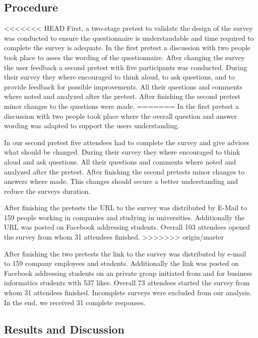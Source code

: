 \documentclass{llncs}
\begin{document}
\begin{keywords}
\subsection{Procedure} %
\label{sec:Procedure}

<<<<<<< HEAD
First, a two-stage pretest to validate the design of the survey was conducted to ensure the questionnaire is understandable and time required to complete the survey is adequate. In the first pretest a discussion with two people took place to asses the wording of the questionnaire. After changing the survey the user feedback a second pretest with five participants was conducted. During their survey they where encouraged to think aloud, to ask questions, and to provide feedback for possible improvements. All their questions and comments where noted and analyzed after the pretest. After finishing the second pretest minor changes to the questions were made. 
=======
In the first pretest a discussion with two people took place where the overall question and answer wording was adapted to support the users understanding.

In our second pretest five attendees had to complete the survey and give advices what should be changed. During their survey they where encouraged to think aloud and ask questions. All their questions and comments where noted and analyzed after the pretest. After finishing the second pretests minor changes to answers where made. This changes should secure a better understanding and reduce the surveys duration.

After finishing the pretests the URL to the survey was distributed by E-Mail to 159 people working in companies and studying in universities. Additionally the URL was posted on Facebook addressing students. Overall 103 attendees opened the survey from whom 31 attendees finished.
>>>>>>> origin/master

After finishing the two pretests the link to the survey was distributed by e-mail to 159 company employees and students. Additionally the link was posted on Facebook addressing students on an private group initiated from and for business informatics students with 537 likes. Overall 73 attendees started the survey from whom 31 attendees finished. Incomplete surveys were excluded from our analysis. In the end, we received 31 complete responses.

\subsection{Results and Discussion} %
\label{sec:Results}


\end{keywords}
\end{document}
